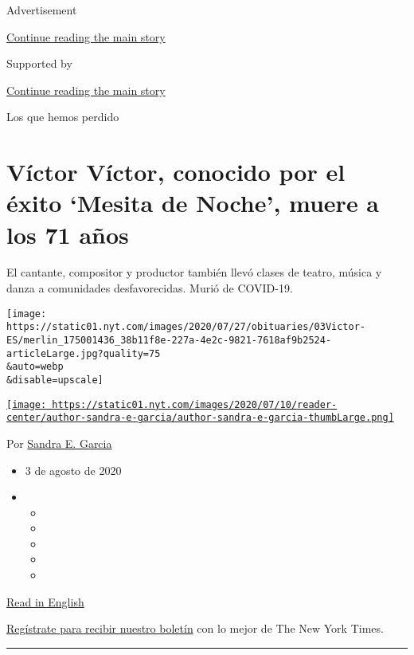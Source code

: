 Advertisement

\protect\hyperlink{after-top}{Continue reading the main story}

Supported by

\protect\hyperlink{after-sponsor}{Continue reading the main story}

Los que hemos perdido

\hypertarget{vuxedctor-vuxedctor-conocido-por-el-uxe9xito-mesita-de-noche-muere-a-los-71-auxf1os}{%
\section{Víctor Víctor, conocido por el éxito `Mesita de Noche', muere a
los 71
años}\label{vuxedctor-vuxedctor-conocido-por-el-uxe9xito-mesita-de-noche-muere-a-los-71-auxf1os}}

El cantante, compositor y productor también llevó clases de teatro,
música y danza a comunidades desfavorecidas. Murió de COVID-19.

\texttt{[image: https://static01.nyt.com/images/2020/07/27/obituaries/03Victor-ES/merlin\_175001436\_38b11f8e-227a-4e2c-9821-7618af9b2524-articleLarge.jpg?quality=75\\\&auto=webp\\\&disable=upscale]}

\href{https://www.nytimes.com/by/sandra-e-garcia}{\texttt{[image: https://static01.nyt.com/images/2020/07/10/reader-center/author-sandra-e-garcia/author-sandra-e-garcia-thumbLarge.png]}}

Por \href{https://www.nytimes.com/by/sandra-e-garcia}{Sandra E. Garcia}

\begin{itemize}
\item
  3 de agosto de 2020
\item
  \begin{itemize}
  \item
  \item
  \item
  \item
  \item
  \end{itemize}
\end{itemize}

\href{https://www.nytimes.com/2020/08/01/obituaries/victor-victor-dead-coronavirus.html}{Read
in English}

\href{https://www.nytimes.com/newsletters/el-times}{Regístrate para
recibir nuestro boletín} con lo mejor de The New York Times.

\begin{center}\rule{0.5\linewidth}{\linethickness}\end{center}

